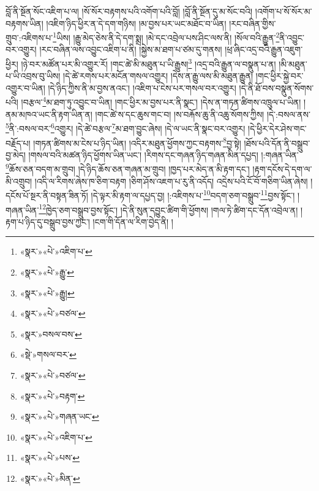 བློ་ནི་སྔོན་སོང་འཇིག་པ་ལ། །སོ་སོར་བརྟགས་པའི་འགོག་པའི་བློ། །བློ་ནི་སྔོན་དུ་མ་སོང་བའི། །འགོག་པ་སོ་སོར་མ་བརྟགས་ཡིན། །འཇིག་ཉིད་ཕྱིར་ན་དེ་དག་གཉིས། །མ་བྱས་པར་ཡང་མཐོང་བ་ཡིན། །རང་བཞིན་གྱིས་གྲུབ་:འཇིགས་པ་\footnote{«སྣར་»«པེ་»འཇིག་པ་}ཡིས། །རྒྱུ་མེད་ཅེས་ནི་དེ་དག་སྨྲ། །མེ་དང་འབྲེལ་པས་ཤིང་ལས་ནི། །སོལ་བའི་རྒྱུན་\footnote{«སྣར་»«པེ་»རྒྱུ་}ནི་འབྱུང་བར་འགྱུར། །རང་བཞིན་ལས་འབྱུང་འཇིག་པ་ནི། །སྐྱེས་མ་ཐག་པ་ཙམ་དུ་གནས། །ཕྲ་ཞིང་འདྲ་བའི་རྒྱུན་འཇུག་ཕྱིར། །ཉེ་བར་མཚོན་པར་མི་འགྱུར་རོ། །གང་ཚེ་མི་མཐུན་པ་ཡི་རྒྱུས།\footnote{«སྣར་»«པེ་»རྒྱུ།} །འདྲ་བའི་རྒྱུན་ལ་བསྣུན་པ་ན། །མི་མཐུན་པ་ཡི་འབྲས་བུ་ཡིས། །དེ་ཚེ་རགས་པར་མངོན་གསལ་འགྱུར། །དེས་ན་རྒྱུ་ལས་མི་མཐུན་རྒྱུན། །གང་ཕྱིར་སྐྱེ་བར་འགྱུར་བ་ཡིན། །དེ་ཉིད་ཀྱིས་ནི་མ་བྱས་ནའང་། །འཇིག་པ་ངེས་པར་གསལ་བར་འགྱུར། །དེ་ནི་ཐོ་བས་བསྣུན་སོགས་པའི། །བརྩལ་\footnote{«སྣར་»«པེ་»བཙལ་}མ་ཐག་ཏུ་འབྱུང་བ་ཡིན། །གང་ཕྱིར་མ་བྱས་པར་ནི་སྣང་། །དེས་ན་གཏན་ཚིགས་འཁྲུལ་པ་ཡིན། །ནམ་མཁའ་ཡང་ནི་རྟག་ཡིན་ན། །གང་ཚེ་ས་དང་ཆུས་གང་བ། །ས་བརྐོས་ཆུ་ནི་འཆུ་སོགས་ཀྱིས། །དེ་:བསལ་ནས་\footnote{«སྣར་»བསལ་བས་}ནི་:བསལ་བར་\footnote{«སྡེ་»གསལ་བར་}འགྱུར། །དེ་ཚེ་བརྩལ་\footnote{«སྣར་»«པེ་»བཙལ་}མ་ཐག་བྱུང་ཞེས། །དེ་ལ་ཡང་ནི་སྣང་བར་འགྱུར། །དེ་ཕྱིར་དེར་ཤེས་གང་བརྗོད་པ། །གཏན་ཚིགས་མ་ངེས་པ་ཉིད་ཡིན། །འདིར་མཐུན་ཕྱོགས་ཀྱང་བརྟགས་\footnote{«སྣར་»«པེ་»བརྟག་}བྱ་སྟེ། །ཐོས་པའི་དོན་ནི་བསྒྲུབ་བྱ་མེད། །གསལ་བའི་མཚན་ཉིད་ཕྱོགས་ཡིན་ཡང་། །རིགས་དང་གཞན་ཉིད་གཞན་མིན་དཔྱད། །:གཞན་ཡིན་\footnote{«སྣར་»«པེ་»གཞན་ཡང་}ཆོས་ཅན་བདག་མ་གྲུབ། །དེ་ཉིད་ཆོས་ཅན་གཞན་མ་གྲུབ། །ཁྱད་པར་མེད་ན་མི་རྟག་དང་། །རྟག་དངོས་དེ་དག་ལ་མི་འགྲུབ། །འདི་ལ་རིགས་ཞེས་ཁ་ཅིག་བརྟག །ཅིག་ཤོས་འཇག་པ་རུ་ནི་འདོད། འདྲེས་པའི་ངོ་བོ་གཅིག་ཡིན་ཞེས། །དངོས་པོ་སྔར་ནི་བསྟན་ཟིན་ཏོ། །དེ་ལྟར་མི་རྟག་ལ་དཔྱད་བྱ། །:འཇིགས་པ་\footnote{«སྣར་»«པེ་»འཇིག་པ་}བདག་ཅག་བསྒྲུབ་\footnote{«སྣར་»«པེ་»པས་}བྱས་སྟོང་། །གཞན་ཡིན་\footnote{«སྣར་»«པེ་»མིན་}ཁྱེད་ཅག་བསྒྲུབ་བྱས་སྟོང་། །དེ་ནི་སུན་དབྱུང་ཚིག་གི་ཕྱོགས། །གལ་ཏེ་ཚིག་དང་དོན་འབྲེལ་ན། །རྟག་པ་ཉིད་དུ་བསྒྲུབ་བྱས་ཀྱང་། །ངག་གི་དོན་ལ་རིག་བྱེད་ནི། །

